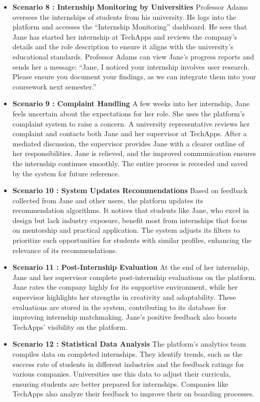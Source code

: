\begin{itemize}
\item \textbf{Scenario 8 : \textbf{Internship Monitoring by Universities} }
Professor Adams oversees the internships of students from his university. He logs into the platform and accesses the “Internship Monitoring” dashboard. He sees that Jane has started her internship at TechApps and reviews the company’s details and the role description to ensure it aligns with the university’s educational standards. Professor Adams can view Jane’s progress reports and sends her a message: “Jane, I noticed your internship involves user research. Please ensure you document your findings, as we can integrate them into your coursework next semester.”

\item \textbf{Scenario 9 : \textbf{Complaint Handling}}
A few weeks into her internship, Jane feels uncertain about the expectations for her role. She uses the platform’s complaint system to raise a concern. A university representative reviews her complaint and contacts both Jane and her supervisor at TechApps. After a mediated discussion, the supervisor provides Jane with a clearer outline of her responsibilities. Jane is relieved, and the improved communication ensures the internship continues smoothly. The entire process is recorded and saved by the system for future reference.

\item \textbf{Scenario 10 : \textbf{System Updates Recommendations} }
Based on feedback collected from Jane and other users, the platform updates its recommendation algorithms. It notices that students like Jane, who excel in design but lack industry exposure, benefit most from internships that focus on mentorship and practical application. The system adjusts its filters to prioritize such opportunities for students with similar profiles, enhancing the relevance of its recommendations.

\item \textbf{Scenario 11 : \textbf{Post-Internship Evaluation} }
At the end of her internship, Jane and her supervisor complete post-internship evaluations on the platform. Jane rates the company highly for its supportive environment, while her supervisor highlights her strengths in creativity and adaptability. These evaluations are stored in the system, contributing to its database for improving internship matchmaking. Jane’s positive feedback also boosts TechApps’ visibility on the platform.

\item \textbf{Scenario 12 : Statistical Data Analysis} 
The platform’s analytics team compiles data on completed internships. They identify trends, such as the success rate of students in different industries and the feedback ratings for various companies.
Universities use this data to adjust their curricula, ensuring students are better prepared for internships. Companies like TechApps also analyze their feedback to improve their on boarding processes.


\end{itemize}
